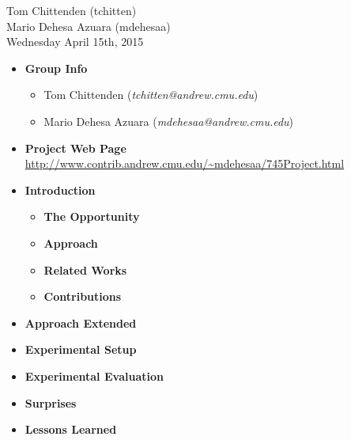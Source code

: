 \documentclass[12pt]{article}
\begin{document}
{\raggedleft
  Tom Chittenden (tchitten) \\
  Mario Dehesa Azuara (mdehesaa) \\
  Wednesday April 15th, 2015 \\
}

\bigskip


\bigskip
\bigskip

\begin{itemize}
    \item \textbf{Group Info}
        \begin{itemize}
            \item Tom Chittenden (\textit{tchitten@andrew.cmu.edu})
            \item Mario Dehesa Azuara (\textit{mdehesaa@andrew.cmu.edu})
        \end{itemize}
    \item \textbf{Project Web Page} \\
    \smallskip
    \url{http://www.contrib.andrew.cmu.edu/~mdehesaa/745Project.html}

    \item \textbf{Introduction} \\
    \smallskip

        \begin{itemize}
            \item \textbf{The Opportunity} 
            \item \textbf{Approach}
            \item \textbf{Related Works}
            \item \textbf{Contributions}
        \end{itemize}

    \item \textbf{Approach Extended} \\
    \smallskip

    \item \textbf{Experimental Setup} \\
    \smallskip

    \item \textbf{Experimental Evaluation} \\
    \smallskip

    \item \textbf{Surprises} \\
    \smallskip

    \item \textbf{Lessons Learned} \\
    \smallskip


\end{itemize}
\end{document}
